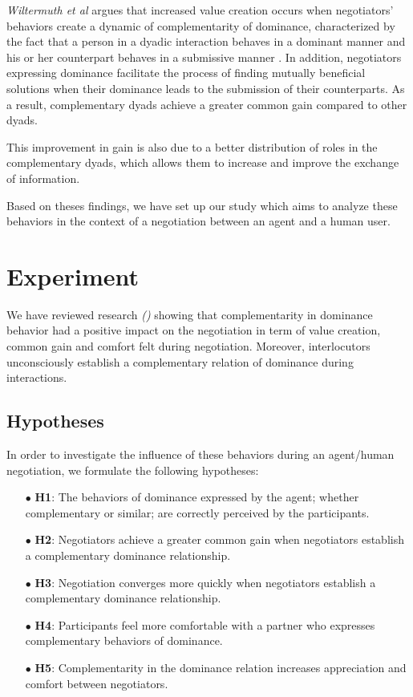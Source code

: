\documentclass[10pt, a4paper]{article} %
\begin{document}
				\emph{Wiltermuth et al} argues that increased value creation occurs when negotiators' behaviors create a dynamic of complementarity of dominance, characterized by the fact that a person in a dyadic interaction behaves in a dominant manner and his or her counterpart behaves in a submissive manner \cite{wiltermuth2015benefits}. In addition, negotiators expressing dominance facilitate the process of finding mutually beneficial solutions when their dominance leads to the submission of their counterparts. As a result, complementary dyads achieve a greater common gain compared to other dyads.
				
				This improvement in gain is also due to a better distribution of roles in the complementary dyads, which allows them to increase and improve the exchange of information. 

				Based on theses findings, we have set up our study which aims to analyze these behaviors in the context of a negotiation between an agent and a human user.

%
\section{Experiment}

	We have reviewed research \emph{(\cite{tiedens2003power,dryer1997opposites,wiltermuth2015benefits})} showing that complementarity in dominance behavior had a positive impact on the negotiation in term of value creation, common gain and comfort felt during negotiation. Moreover, interlocutors unconsciously establish a complementary relation of dominance during interactions.

	\subsection{Hypotheses}	
	In order to investigate the influence of these behaviors during an agent/human negotiation, we formulate the following hypotheses: 

	
	\begin{itemize}
		\item [$\bullet$] \textbf{H1}: The behaviors of dominance expressed by the agent; whether complementary or similar; are correctly perceived by the participants.
		\item [$\bullet$] \textbf{H2}: Negotiators achieve a greater common gain when negotiators establish a complementary dominance relationship.
		\item [$\bullet$] \textbf{H3}: Negotiation converges more quickly when negotiators establish a complementary dominance relationship. 
		\item [$\bullet$] \textbf{H4}: Participants feel more comfortable with a partner who expresses complementary behaviors of dominance.
		\item [$\bullet$] \textbf{H5}: Complementarity in the dominance relation increases appreciation and comfort between negotiators.
		
	\end{itemize}
\end{document}
